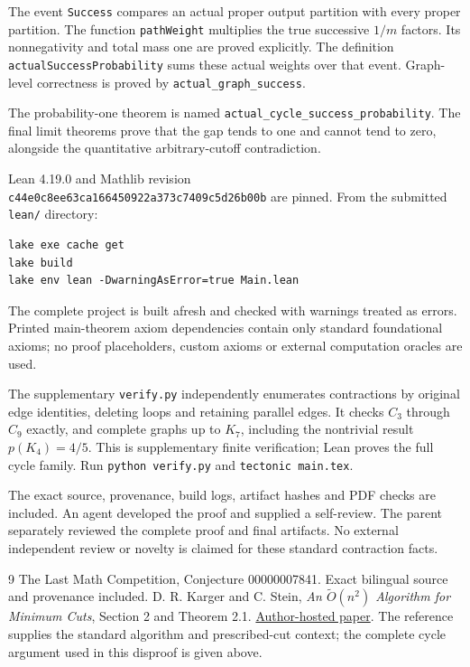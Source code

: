 \documentclass[11pt]{article}
\begin{document}
The event \texttt{Success} compares an actual proper
output partition with every proper partition.
The function \texttt{pathWeight} multiplies the true
successive $1/m$ factors. Its nonnegativity and total
mass one are proved explicitly. The definition
\texttt{actualSuccessProbability} sums these actual
weights over that event.
Graph-level correctness is proved by
\texttt{actual\_graph\_success}.
\par
The probability-one theorem is named
\texttt{actual\_cycle\_success\_probability}.
The final limit theorems prove that the gap tends to
one and cannot tend to zero, alongside the quantitative
arbitrary-cutoff contradiction.

Lean 4.19.0 and Mathlib revision\\
\texttt{c44e0c8ee63ca166450922a373c7409c5d26b00b}
are pinned. From the submitted \texttt{lean/} directory:
\begin{verbatim}
lake exe cache get
lake build
lake env lean -DwarningAsError=true Main.lean
\end{verbatim}
The complete project is built afresh and checked with
warnings treated as errors. Printed main-theorem
axiom dependencies contain only standard foundational
axioms; no proof placeholders, custom axioms or
external computation oracles are used.

The supplementary \texttt{verify.py} independently
enumerates contractions by original edge identities,
deleting loops and retaining parallel edges. It checks
$C_3$ through $C_9$ exactly, and complete graphs up to
$K_7$, including the nontrivial result $p(K_4)=4/5$.
This is supplementary finite verification; Lean proves
the full cycle family. Run \texttt{python verify.py}
and \texttt{tectonic main.tex}.

The exact source, provenance, build logs, artifact
hashes and PDF checks are included. An agent developed
the proof and supplied a self-review. The parent
separately reviewed the complete proof and final
artifacts. No external independent review or novelty
is claimed for these standard contraction facts.

\begin{thebibliography}{9}
 The Last Math Competition, Conjecture
00000007841. Exact bilingual source and provenance included.
 D. R. Karger and C. Stein,
\emph{An $\widetilde O(n^2)$ Algorithm for Minimum Cuts},
Section 2 and Theorem 2.1.
\href{https://people.csail.mit.edu/karger/Papers/fastcut.pdf}{Author-hosted paper}.
The reference supplies the standard algorithm and
prescribed-cut context; the complete cycle argument
used in this disproof is given above.
\end{thebibliography}
\end{document}
